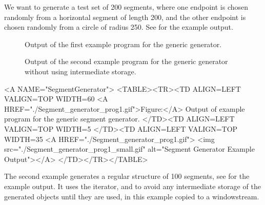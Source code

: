 We want to generate a test set of 200 segments, where one endpoint is
chosen randomly from a horizontal segment of length 200, and the other
endpoint is chosen randomly from a circle of radius 250. See
 for the example
output.

\begin{ccTexOnly}
  \begin{figure}
    \noindent
    \hspace*{0.025\textwidth}%
    \begin{minipage}[t]{0.45\textwidth}%
      \caption{Output of the first example program for the generic generator.}
      \label{figureSegmentGenerator}
    \end{minipage}%
    \hspace*{0.05\textwidth}%
    \begin{minipage}[t]{0.45\textwidth}%
      \caption{Output of the second example program for the generic
        generator without using intermediate storage.}
      \label{figureSegmentGeneratorFan}
    \end{minipage}%
  \end{figure}
\end{ccTexOnly}


\begin{ccHtmlOnly}
  <A NAME="SegmentGenerator">
  <TABLE><TR><TD ALIGN=LEFT VALIGN=TOP WIDTH=60%
    <A HREF="./Segment_generator_prog1.gif">Figure:</A>
    Output of example program for the generic segment generator.
  </TD><TD ALIGN=LEFT VALIGN=TOP WIDTH=5%
  </TD><TD ALIGN=LEFT VALIGN=TOP WIDTH=35%
    <A HREF="./Segment_generator_prog1.gif">
        <img src="./Segment_generator_prog1_small.gif" 
             alt="Segment Generator Example Output"></A>
  </TD></TR></TABLE>
\end{ccHtmlOnly}

The second example generates a regular structure of 100 segments, see 
 for the example
output. It uses the  iterator,
 and  to
avoid any intermediate storage of the generated objects until they are
used, in this example copied to a windowstream.

